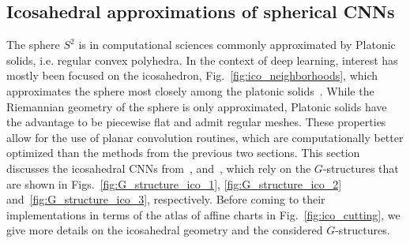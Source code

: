 

\subsection{Icosahedral approximations of spherical CNNs}
\label{sec:spherical_CNNs_icosahedral}

The sphere $S^2$ is in computational sciences commonly approximated by Platonic solids, i.e. regular convex polyhedra.
In the context of deep learning, interest has mostly been focused on the icosahedron, Fig.~\ref{fig:ico_neighborhoods}, which approximates the sphere most closely among the platonic solids~\cite{schroder1995spherical}.
While the Riemannian geometry of the sphere is only approximated, Platonic solids have the advantage to be piecewise flat and admit regular meshes.
These properties allow for the use of planar convolution routines, which are computationally better optimized than the methods from the previous two sections.
This section discusses the icosahedral CNNs from~\cite{liu2018icoAltAz}, \cite{zhang2019orientation} and~\cite{gaugeIco2019}, which rely on the $G$-structures that are shown in Figs.~\ref{fig:G_structure_ico_1}, \ref{fig:G_structure_ico_2} and~\ref{fig:G_structure_ico_3}, respectively.
Before coming to their implementations in terms of the atlas of affine charts in Fig.~\ref{fig:ico_cutting},
we give more details on the icosahedral geometry and the considered $G$-structures.


